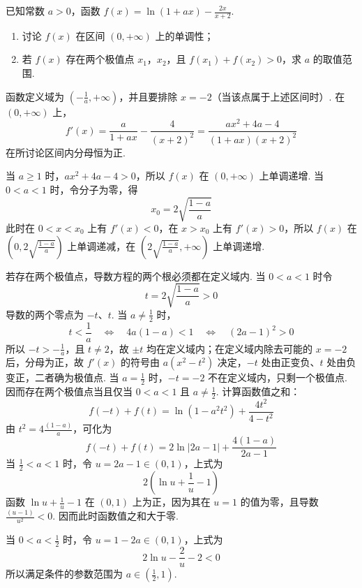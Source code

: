 \begin{problem}
已知常数 \(a > 0\)，函数 \(f(x) = \ln\left(1 + ax\right) - \frac{2x}{x + 2}\).

\begin{enumerate}
\item 讨论 \(f(x)\) 在区间 \((0, +\infty)\) 上的单调性；
\item 若 \(f(x)\) 存在两个极值点 \(x_{1}\)，\(x_{2}\)，且 \(f(x_{1}) + f(x_{2}) > 0\)，求 \(a\) 的取值范围.
\end{enumerate}

\begin{solution}
函数定义域为 \(\left(-\frac1a,+\infty\right)\)，并且要排除 \(x=-2\)（当该点属于上述区间时）. 在 \((0,+\infty)\) 上，
\[
f'(x)=\frac{a}{1+ax}-\frac{4}{(x+2)^2}
=\frac{ax^2+4a-4}{(1+ax)(x+2)^2}
\]
在所讨论区间内分母恒为正.

当 \(a\geqslant1\) 时，\(ax^2+4a-4>0\)，所以 \(f(x)\) 在 \((0,+\infty)\) 上单调递增. 当 \(0<a<1\) 时，令分子为零，得
\[
x_0=2\sqrt{\frac{1-a}{a}}
\]
此时在 \(0<x<x_0\) 上有 \(f'(x)<0\)，在 \(x>x_0\) 上有 \(f'(x)>0\)，所以 \(f(x)\) 在 \(\left(0,2\sqrt{\frac{1-a}{a}}\right)\) 上单调递减，在 \(\left(2\sqrt{\frac{1-a}{a}},+\infty\right)\) 上单调递增.

若存在两个极值点，导数方程的两个根必须都在定义域内. 当 \(0<a<1\) 时令
\[
t=2\sqrt{\frac{1-a}{a}}>0
\]
导数的两个零点为 \(-t\)、\(t\). 当 \(a\ne\frac12\) 时，
\[
t<\frac1a
\quad\Longleftrightarrow\quad
4a(1-a)<1
\quad\Longleftrightarrow\quad
(2a-1)^2>0
\]
所以 \(-t>-\frac1a\)，且 \(t\ne2\)，故 \(\pm t\) 均在定义域内；在定义域内除去可能的 \(x=-2\) 后，分母为正，故 \(f'(x)\) 的符号由 \(a(x^2-t^2)\) 决定，\(-t\) 处由正变负、\(t\) 处由负变正，二者确为极值点. 当 \(a=\frac12\) 时，\(-t=-2\) 不在定义域内，只剩一个极值点. 因而存在两个极值点当且仅当 \(0<a<1\) 且 \(a\ne\frac12\). 计算函数值之和：
\[
f(-t)+f(t)=\ln(1-a^2t^2)+\frac{4t^2}{4-t^2}
\]
由 \(t^2=4\frac{(1-a)}{a}\)，可化为
\[
f(-t)+f(t)=2\ln|2a-1|+\frac{4(1-a)}{2a-1}
\]
当 \(\frac12<a<1\) 时，令 \(u=2a-1\in(0,1)\)，上式为
\[
2\left(\ln u+\frac1u-1\right)
\]
函数 \(\ln u+\frac{1}{u}-1\) 在 \((0,1)\) 上为正，因为其在 \(u=1\) 的值为零，且导数 \(\frac{(u-1)}{u^2}<0\). 因而此时函数值之和大于零.

当 \(0<a<\frac12\) 时，令 \(u=1-2a\in(0,1)\)，上式为
\[
2\ln u-\frac2u-2<0
\]
所以满足条件的参数范围为 \(a\in\left(\frac12,1\right)\).
\end{solution}
\end{problem}
